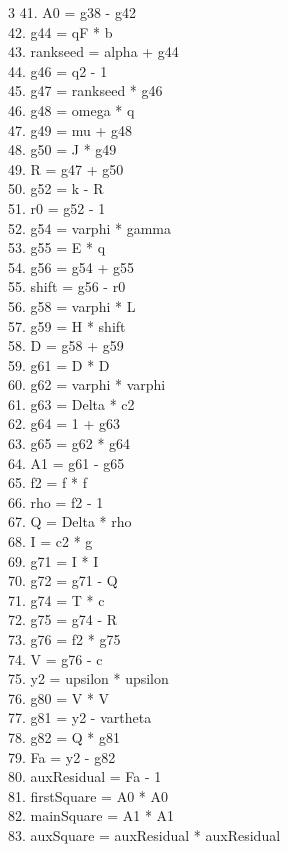 \documentclass[10pt]{article}
\begin{document}
\begin{multicols}{3}
41. A0 = g38 - g42\\
42. g44 = qF * b\\
43. rankseed = alpha + g44\\
44. g46 = q2 - 1\\
45. g47 = rankseed * g46\\
46. g48 = omega * q\\
47. g49 = mu + g48\\
48. g50 = J * g49\\
49. R = g47 + g50\\
50. g52 = k - R\\
51. r0 = g52 - 1\\
52. g54 = varphi * gamma\\
53. g55 = E * q\\
54. g56 = g54 + g55\\
55. shift = g56 - r0\\
56. g58 = varphi * L\\
57. g59 = H * shift\\
58. D = g58 + g59\\
59. g61 = D * D\\
60. g62 = varphi * varphi\\
61. g63 = Delta * c2\\
62. g64 = 1 + g63\\
63. g65 = g62 * g64\\
64. A1 = g61 - g65\\
65. f2 = f * f\\
66. rho = f2 - 1\\
67. Q = Delta * rho\\
68. I = c2 * g\\
69. g71 = I * I\\
70. g72 = g71 - Q\\
71. g74 = T * c\\
72. g75 = g74 - R\\
73. g76 = f2 * g75\\
74. V = g76 - c\\
75. y2 = upsilon * upsilon\\
76. g80 = V * V\\
77. g81 = y2 - vartheta\\
78. g82 = Q * g81\\
79. Fa = y2 - g82\\
80. auxResidual = Fa - 1\\
81. firstSquare = A0 * A0\\
82. mainSquare = A1 * A1\\
83. auxSquare = auxResidual * auxResidual\\

\end{multicols}
\end{document}
